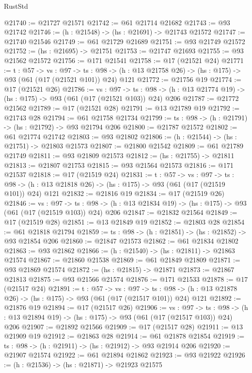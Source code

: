 \begin{lexlean}{RustStd}
\begin{coremodule}
@21740 := @21727 @21571
@21742 := @61 @21714 @21682
@21743 := @93 @21742
@21746 := (h : @21548) -> (hs : @21691) -> @21743 @21572
@21747 := @21740 @21546
@21749 := @61 @21729 @21689
@21751 := @93 @21749 @21572
@21752 := (hs : @21695) -> @21751
@21753 := @21747 @21693
@21755 := @93 @21562 @21572
@21756 := @171 @21541
@21758 := @17 (@21521 @24)
@21771 := {t : @57} ->
  {vs : @97} ->
  {ts : @98} -> (h : @13 @21758 @26) -> (hs : @175) -> @93 (@61 (@17 (@21521 @101)) @24) @121
@21772 := @21756 @19
@21774 := @17 (@21521 @26)
@21786 := {vs : @97} ->
  {ts : @98} -> (h : @13 @21774 @19) -> (hs : @175) -> @93 (@61 (@17 (@21521 @103)) @24) @206
@21787 := @21772 @21562
@21789 := @17 (@21521 @28)
@21791 := @13 @21789 @19
@21792 := @21743 @28
@21794 := @61 @21758 @21734
@21799 := {ts : @98} -> (h : @21791) -> (hs : @21792) -> @93 @21794 @206
@21800 := @21787 @21572
@21802 := @61 @21774 @21742
@21803 := @93 @21802
@21806 := (h : @21544) -> (hs : @21751) -> @21803 @21573
@21807 := @21800 @21542
@21809 := @61 @21789 @21749
@21811 := @93 @21809 @21573
@21812 := (hs : @21755) -> @21811
@21813 := @21807 @21753
@21815 := @93 @21564 @21573
@21816 := @171 @21537
@21818 := @17 (@21519 @24)
@21831 := {t : @57} ->
  {vs : @97} ->
  {ts : @98} -> (h : @13 @21818 @26) -> (hs : @175) -> @93 (@61 (@17 (@21519 @101)) @24) @121
@21832 := @21816 @19
@21834 := @17 (@21519 @26)
@21846 := {vs : @97} ->
  {ts : @98} -> (h : @13 @21834 @19) -> (hs : @175) -> @93 (@61 (@17 (@21519 @103)) @24) @206
@21847 := @21832 @21564
@21849 := @17 (@21519 @28)
@21851 := @13 @21849 @19
@21852 := @21803 @28
@21854 := @61 @21818 @21794
@21859 := {ts : @98} -> (h : @21851) -> (hs : @21852) -> @93 @21854 @206
@21860 := @21847 @21573
@21862 := @61 @21834 @21802
@21863 := @93 @21862
@21866 := (h : @21540) -> (hs : @21811) -> @21863 @21574
@21867 := @21860 @21538
@21869 := @61 @21849 @21809
@21871 := @93 @21869 @21574
@21872 := (hs : @21815) -> @21871
@21873 := @21867 @21813
@21875 := @93 @21566 @21574
@21876 := @171 @21533
@21878 := @17 (@21517 @24)
@21891 := {t : @57} ->
  {vs : @97} ->
  {ts : @98} -> (h : @13 @21878 @26) -> (hs : @175) -> @93 (@61 (@17 (@21517 @101)) @24) @121
@21892 := @21876 @19
@21894 := @17 (@21517 @26)
@21906 := {vs : @97} ->
  {ts : @98} -> (h : @13 @21894 @19) -> (hs : @175) -> @93 (@61 (@17 (@21517 @103)) @24) @206
@21907 := @21892 @21566
@21909 := @17 (@21517 @28)
@21911 := @13 @21909 @19
@21912 := @21863 @28
@21914 := @61 @21878 @21854
@21919 := {ts : @98} -> (h : @21911) -> (hs : @21912) -> @93 @21914 @206
@21920 := @21907 @21574
@21922 := @61 @21894 @21862
@21923 := @93 @21922
@21926 := (h : @21536) -> (hs : @21871) -> @21923 @21575

\end{coremodule}
\end{lexlean}
